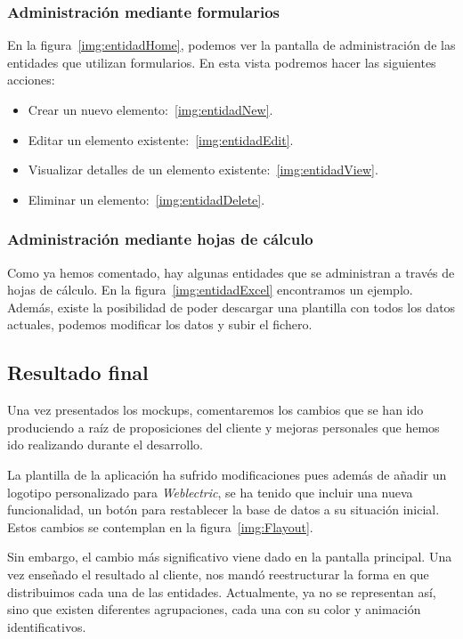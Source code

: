 \subsubsection{Administración mediante formularios} 

En la figura~\ref{img:entidadHome}, podemos ver la pantalla de administración de las entidades que utilizan formularios. En esta vista podremos hacer las siguientes acciones:

\begin{itemize}
	\item Crear un nuevo elemento:~\ref{img:entidadNew}.
	\item Editar un elemento existente:~\ref{img:entidadEdit}.
	\item Visualizar detalles de un elemento existente:~\ref{img:entidadView}.
	\item Eliminar un elemento:~\ref{img:entidadDelete}.
\end{itemize}

\subsubsection{Administración mediante hojas de cálculo} 

Como ya hemos comentado, hay algunas entidades que se administran a través de hojas de cálculo. En la figura~\ref{img:entidadExcel} encontramos un ejemplo. Además, existe la posibilidad de poder descargar una plantilla con todos los datos actuales, podemos modificar los datos y subir el fichero. 

\newpage

\subsection{Resultado final} 

Una vez presentados los mockups, comentaremos los cambios que se han ido produciendo a raíz de proposiciones del cliente y mejoras personales que hemos ido realizando durante el desarrollo.

La plantilla de la aplicación ha sufrido modificaciones pues además de añadir un logotipo personalizado para \textit{Weblectric}, se ha tenido que incluir una nueva funcionalidad, un botón para restablecer la base de datos a su situación inicial. Estos cambios se contemplan en la figura~\ref{img:Flayout}.

Sin embargo, el cambio más significativo viene dado en la pantalla principal. Una vez enseñado el resultado al cliente, nos mandó reestructurar la forma en que distribuimos cada una de las entidades. Actualmente, ya no se representan así, sino que existen diferentes agrupaciones, cada una con su color y animación identificativos.

